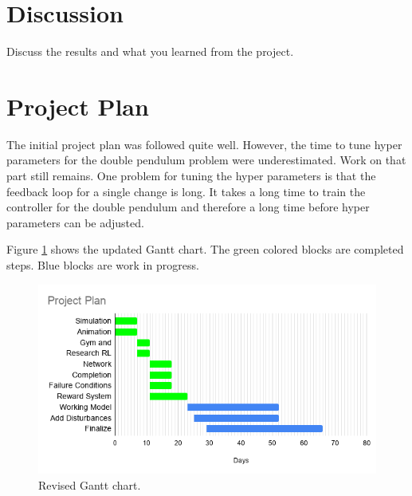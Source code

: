 \documentclass{LTHtwocol} %
\begin{document}

\section{Discussion}

Discuss the results and what you learned from the project.

\section{Project Plan}
The initial project plan was followed quite well.
However, the time to tune hyper parameters for the double pendulum problem were underestimated.
Work on that part still remains.
One problem for tuning the hyper parameters is that the feedback loop for a single change is long.
It takes a long time to train the controller for the double pendulum and therefore a long time before hyper parameters can be adjusted.

Figure \ref{fig:gantt_chart} shows the updated Gantt chart.
The green colored blocks are completed steps.
Blue blocks are work in progress.
\begin{figure}[H]
   \centering
   \includegraphics[width=0.9\columnwidth]{figures/Revised_Project_plan.png}
   \caption{Revised Gantt chart.}
   \label{fig:gantt_chart}
\end{figure}

\printbibliography
\end{document}
